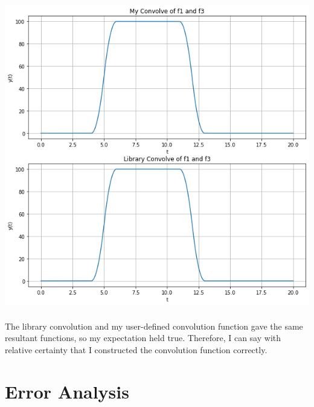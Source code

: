 \documentclass[12pt]{report}
\begin{document}
    \includegraphics[scale=0.6]{task 4.png}

    \paragraph{} The library convolution and my user-defined convolution function gave the same resultant functions, so my expectation held true. Therefore, I can say with relative certainty that I constructed the convolution function correctly.  

\section{Error Analysis}

\end{document}
